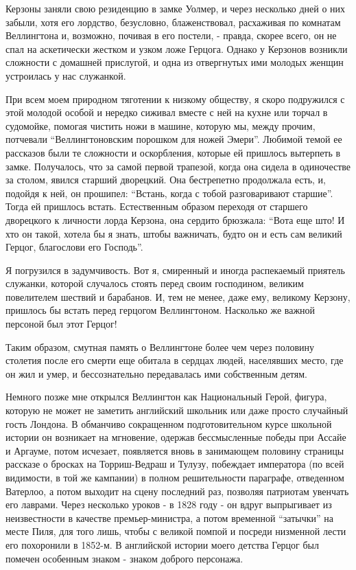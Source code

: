 \documentclass[
  oneside,
  12pt,
  titlepage]{book}
\begin{document}
Керзоны заняли свою резиденцию в замке Уолмер, и через несколько дней о них забыли, хотя его лордство, безусловно, блаженствовал, расхаживая по комнатам Веллингтона и, возможно, почивая в его постели, - правда, скорее всего, он не спал на аскетически жестком и узком ложе Герцога. Однако у Керзонов возникли сложности с домашней прислугой, и одна из отвергнутых ими молодых женщин устроилась у нас служанкой.

При всем моем природном тяготении к низкому обществу, я скоро подружился с этой молодой особой и нередко сиживал вместе с ней на кухне или торчал в судомойке, помогая чистить ножи в машине, которую мы, между прочим, потчевали ``Веллингтоновским порошком для ножей Эмери''. Любимой темой ее рассказов были те сложности и оскорбления, которые ей пришлось вытерпеть в замке. Получалось, что за самой первой трапезой, когда она сидела в одиночестве за столом, явился старший дворецкий. Она бестрепетно продолжала есть, и, подойдя к ней, он прошипел: ``Встань, когда с тобой разговаривают старшие''. Тогда ей пришлось встать. Естественным образом переходя от старшего дворецкого к личности лорда Керзона, она сердито брюзжала: ``Вота еще што! И хто он такой, хотела бы я знать, штобы важничать, будто он и есть сам великий Герцог, благослови его Господь''.

Я погрузился в задумчивость. Вот я, смиренный и иногда распекаемый приятель служанки, которой случалось стоять перед своим господином, великим повелителем шествий и барабанов. И, тем не менее, даже ему, великому Керзону, пришлось бы встать перед герцогом Веллингтоном. Насколько же важной персоной был этот Герцог!

Таким образом, смутная память о Веллингтоне более чем через половину столетия после его смерти еще обитала в сердцах людей, населявших место, где он жил и умер, и бессознательно передавалась ими собственным детям.

Немного позже мне открылся Веллингтон как Национальный Герой, фигура, которую не может не заметить английский школьник или даже просто случайный гость Лондона. В обманчиво сокращенном подготовительном курсе школьной истории он возникает на мгновение, одержав бессмысленные победы при Ассайе и Аргауме, потом исчезает, появляется вновь в занимающем половину страницы рассказе о бросках на Торриш-Ведраш и Тулузу, побеждает императора (по всей видимости, в той же кампании) в полном решительности параграфе, отведенном Ватерлоо, а потом выходит на сцену последний раз, позволяя патриотам увенчать его лаврами. Через несколько уроков - в 1828 году - он вдруг выпрыгивает из неизвестности в качестве премьер-министра, а потом временной ``затычки'' на месте Пиля, для того лишь, чтобы с великой помпой и посреди низменной лести его похоронили в 1852-м. В английской истории моего детства Герцог был помечен особенным знаком - знаком доброго персонажа.
\end{document}
